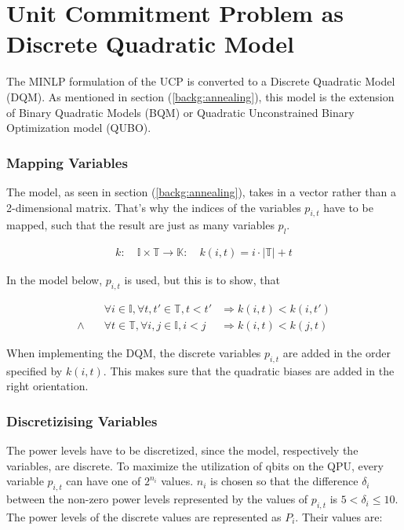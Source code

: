 \section{Unit Commitment Problem as Discrete Quadratic Model}
\label{approach:annealing.formulate}

The MINLP formulation of the UCP is converted to a Discrete Quadratic Model (DQM).
As mentioned in section (\ref{backg:annealing}), this model is the extension
of Binary Quadratic Models (BQM) or Quadratic Unconstrained Binary Optimization model (QUBO).

\subsubsection{Mapping Variables}

The model, as seen in section (\ref{backg:annealing}), takes in a vector rather than a 2-dimensional matrix.
That's why the indices of the variables $p_{i,t}$ have to be mapped, such that the result are just as many variables $p_{l}$.

\begin{align}
  k:
  \quad
  \mathbb{I} \times \mathbb{T} \to \mathbb{K}:
  \quad
  k(i, t) = i \cdot | \mathbb{T} | + t
\end{align}

In the model below, $p_{i,t}$ is used, but this is to show, that

\begin{subequations}
\begin{align}
  &
  \forall i \in \mathbb{I}, \forall t, t' \in \mathbb{T}, t < t'
  &
  \Rightarrow k(i, t) < k(i, t')
  \\
  \land \quad
  &
  \forall t \in \mathbb{T}, \forall i, j \in \mathbb{I}, i < j
  &
  \Rightarrow k(i, t) < k(j, t)
\end{align}
\end{subequations}

When implementing the DQM, the discrete variables $p_{i, t}$ are added in the order specified by $k(i, t)$.
This makes sure that the quadratic biases are added in the right orientation.

\subsubsection{Discretizising Variables}

The power levels have to be discretized, since the model, respectively the variables, are discrete.
To maximize the utilization of qbits on the QPU, every variable $p_{i, t}$ can have one of $2^{n_i}$ values.
$n_i$ is chosen so that the difference $\delta_i$ between the non-zero power levels represented by the values of $p_{i, t}$
is $5 < \delta_i \leq 10$.
The power levels of the discrete values are represented as $P_i$.
Their values are:

